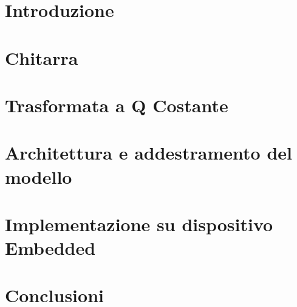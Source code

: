 \documentclass[12pt,a4paper]{book}
\begin{document}
    
    
    \tableofcontents
    
    \chapter*{Introduzione} 
    \label{CH:Intro}
    
    
    \chapter{Chitarra}
    \label{CH:Teoria}
    
    
    \chapter{Trasformata a Q Costante}
    \label{CH:Teoria}
    
    
    \chapter{Architettura e addestramento del modello}
    \label{CH:Val_num}
    
    
    \chapter{Implementazione su dispositivo Embedded}
    \label{CH:Val_num}
    
    
    \chapter{Conclusioni}
    \label{CH:Concl}
    
    
\end{document}
